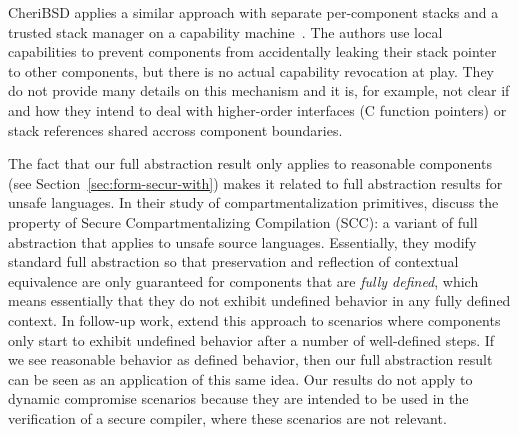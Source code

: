 \documentclass[acmsmall,review,anonymous]{acmart}\settopmatter{printfolios=true,printccs=false,printacmref=false}
\begin{document}
CheriBSD applies a similar approach with separate per-component stacks and a trusted stack manager on a capability machine~\cite{watson_cheri:_2015}.
The authors use local capabilities to prevent components from accidentally leaking their stack pointer to other components, but there is no actual capability revocation at play.
They do not provide many details on this mechanism and it is, for example, not clear if and how they intend to deal with higher-order interfaces (C function pointers) or stack references shared accross component boundaries. 

The fact that our full abstraction result only applies to reasonable components (see Section~\ref{sec:form-secur-with}) makes it related to full abstraction results for unsafe languages.
In their study of compartmentalization primitives,  discuss the property of Secure Compartmentalizing Compilation (SCC): a variant of full abstraction that applies to unsafe source languages.
Essentially, they modify standard full abstraction so that preservation and reflection of contextual equivalence are only guaranteed for components that are {\itshape fully defined}, which means essentially that they do not exhibit undefined behavior in any fully defined context.
In follow-up work, \citet{DBLP:journals/corr/abs-1802-00588} extend this approach to scenarios where components only start to exhibit undefined behavior after a number of well-defined steps.
If we see reasonable behavior as defined behavior, then our full abstraction result can be seen as an application of this same idea.
Our results do not apply to dynamic compromise scenarios because they are intended to be used in the verification of a secure compiler, where these scenarios are not relevant.





\end{document}
